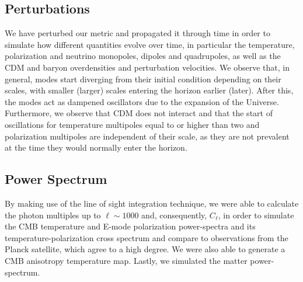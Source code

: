 \documentclass{aa}
\begin{document}
\subsection{Perturbations}

We have perturbed our metric and propagated it through time in order to simulate how different quantities evolve over time, in particular the temperature, polarization and neutrino monopoles, dipoles and quadrupoles, as well as the CDM and baryon overdensities and perturbation velocities. We observe that, in general, modes start diverging from their initial condition depending on their scales, with smaller (larger) scales entering the horizon earlier (later). After this, the modes act as dampened oscillators due to the expansion of the Universe. Furthermore, we observe that CDM does not interact and that the start of oscillations for temperature multipoles equal to or higher than two and polarization multipoles are independent of their scale, as they are not prevalent at the time they would normally enter the horizon.

\subsection{Power Spectrum}

By making use of the line of sight integration technique, we were able to calculate the photon multiples up to $\ell\sim1000$ and, consequently, $C_\ell$, in order to simulate the CMB temperature and E-mode polarization power-spectra and its temperature-polarization cross spectrum and compare to observations from the Planck satellite, which agree to a high degree. We were also able to generate a CMB anisotropy temperature map. Lastly, we simulated the matter power-spectrum. 



%
%



\end{document}
